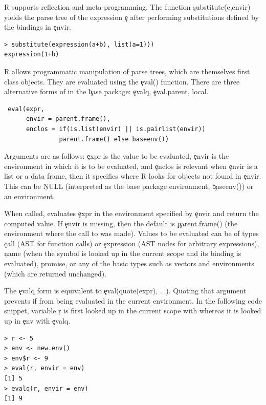 \documentclass[conference]{IEEEtran}
\begin{document}
R supports reflection and meta-programming. The function \c{substitute(e,envir)}
yields the parse tree of the expression \c{e} after performing substitutions
defined by the bindings in \c{envir}.

\begin{lstlisting}
> substitute(expression(a+b), list(a=1)))  
expression(1+b)
\end{lstlisting}

\noindent
R allows programmatic manipulation of parse trees, which are themselves
first class objects. They are evaluated using the \c{eval()}
function. There are three alternative forms  of \eval in the \c{base} package:
\c{evalq}, \c{eval.parent}, \c{local}.

\begin{lstlisting}
 eval(expr,
      envir = parent.frame(),
      enclos = if(is.list(envir) || is.pairlist(envir))
               parent.frame() else baseenv())
\end{lstlisting}           

Arguments are as follows: \c{expr} is the value to be evaluated, \c{envir}
is the environment in which it is to be evaluated, and \c{enclos} is
relevant when \c{envir} is a list or a data frame, then it specifies where R
looks for objects not found in \c{envir}. This can be \c{NULL} (interpreted
as the base package environment, \c{baseenv()}) or an environment.

When called, \eval evaluates \c{expr} in the environment specified by
\c{envir} and return the computed value. If \c{envir} is missing, then the
default is \c{parent.frame()} (the environment where the call to \eval was
made).  Values to be evaluated can be of types \c{call} (AST for function
calls) or \c{expression} (AST nodes for arbitrary expressions), \c{name}
(when the symbol is looked up in the current scope and its binding is
evaluated), promise, or any of the basic types such as vectors and
environments (which are returned unchanged).

The \c{evalq} form is equivalent to \c{eval(quote(expr), ...)}.  Quoting
that argument prevents if from being evaluated in the current environment.
In the following code snippet, variable \c{r} is first looked up in
the current scope with \eval whereas it is looked up in \c{env} with
\c{evalq}.

\begin{lstlisting}
> r <- 5
> env <- new.env()
> env$r <- 9
> eval(r, envir = env)
[1] 5
> evalq(r, envir = env)
[1] 9
\end{lstlisting}
\end{document}
